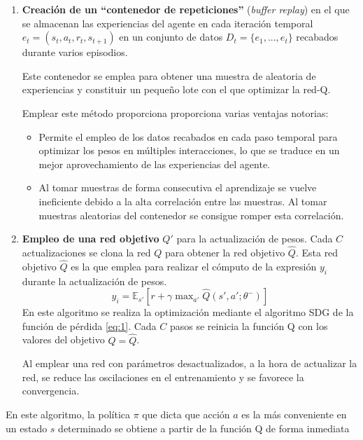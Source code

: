 \begin{enumerate}
	\item \textbf{Creación de un ``contenedor de repeticiones''} (\textit{buffer replay}) en el que se almacenan las experiencias del agente en cada iteración temporal $e_t=(s_t,a_t,r_t,s_{t+1})$ en un conjunto de datos $D_t=\{e_1,...,e_t\}$ recabados durante varios episodios.
	
	Este contenedor se emplea para obtener una muestra de aleatoria de experiencias y constituir un pequeño lote con el que optimizar la red-Q.
	
	Emplear este método proporciona proporciona varias ventajas notorias:
	
	\begin{itemize}
		\item Permite el empleo de los datos recabados en cada paso temporal para optimizar los pesos en múltiples interacciones, lo que se traduce en un mejor aprovechamiento de las experiencias del agente.
		
		\item Al tomar muestras de forma consecutiva el aprendizaje se vuelve ineficiente debido a la alta correlación entre las muestras. Al tomar muestras aleatorias del contenedor se consigue romper esta correlación.
	\end{itemize}
	
	\item \textbf{Empleo de una red objetivo }$Q'$ para la actualización de pesos.  Cada $C$ actualizaciones se clona la red $Q$ para obtener la red objetivo $\hat Q$. Esta red objetivo $\hat Q$ es la que emplea para realizar el cómputo de la expresión $y_i$ durante la actualización de pesos.
	\begin{equation}
	y_i= \mathbb{E}_{s'}[ r + \gamma \; {\text{max}_{a'}} \; \hat Q(s',a';\theta^-)]
	\end{equation}
	En este algoritmo se realiza la optimización mediante el algoritmo SDG de la función de pérdida \ref{eq:1}.  Cada $C$ pasos se reinicia la función Q con los valores del objetivo $Q=\hat Q$.
	
	Al emplear una red con parámetros desactualizados, a la hora de actualizar la red, se  reduce las oscilaciones en el entrenamiento y se favorece la convergencia.
	
\end{enumerate}

En este algoritmo, la política $\pi$ que dicta que acción $a$ es la más conveniente en un estado $s$ determinado se obtiene a partir de la función Q de forma inmediata

